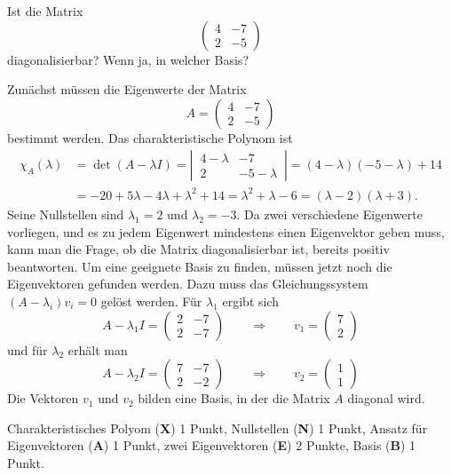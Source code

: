 Ist die Matrix
\[
\begin{pmatrix}
4&-7\\
2&-5
\end{pmatrix}
\]
diagonalisierbar? Wenn ja, in welcher Basis?


\begin{loesung}
Zunächst müssen die Eigenwerte der Matrix
\[
A=
\begin{pmatrix}
4&-7\\
2&-5
\end{pmatrix}
\]
bestimmt werden. Das
charakteristische Polynom ist
\begin{align*}
\chi_A(\lambda)&=
\det(A-\lambda I)
=
\left|\,\begin{matrix}4-\lambda&-7\\2&-5-\lambda\end{matrix}\,\right|
=(4-\lambda)(-5-\lambda)+14\\
&=-20+5\lambda-4\lambda+\lambda^2+14
=\lambda^2+\lambda-6=(\lambda -2)(\lambda +3).
\end{align*}
Seine Nullstellen sind $\lambda_1=2$ und $\lambda_2=-3$. Da zwei
verschiedene Eigenwerte vorliegen, und es zu jedem Eigenwert
mindestens einen Eigenvektor geben muss, kann man die Frage, ob
die Matrix diagonalisierbar ist, bereits positiv beantworten. Um
eine geeignete Basis zu finden, müssen jetzt noch die Eigenvektoren
gefunden werden. Dazu muss das Gleichungssystem $(A-\lambda_i)v_i=0$
gelöst werden. Für $\lambda_1$ ergibt sich
\[
A-\lambda_1 I=\begin{pmatrix}
2&-7\\
2&-7
\end{pmatrix}
\qquad \Rightarrow\qquad v_1=\begin{pmatrix}7\\2\end{pmatrix}
\]
und für $\lambda_2$ erhält man
\[
A-\lambda_2 I=\begin{pmatrix}
7&-7\\
2&-2
\end{pmatrix}
\qquad \Rightarrow\qquad v_2=\begin{pmatrix}1\\1\end{pmatrix}
\]
Die Vektoren $v_1$ und $v_2$ bilden eine Basis, in der die Matrix $A$
diagonal wird.
\end{loesung}

\begin{bewertung}
Charakteristisches Polyom ({\bf X}) 1 Punkt,
Nullstellen ({\bf N}) 1 Punkt,
Ansatz für Eigenvektoren ({\bf A}) 1 Punkt,
zwei Eigenvektoren ({\bf E}) 2 Punkte,
Basis ({\bf B}) 1 Punkt.
\end{bewertung}
